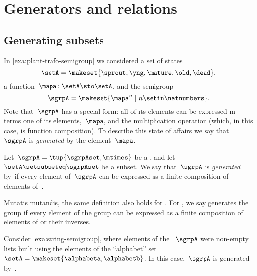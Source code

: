 
\section{Generators and relations}


\subsection{Generating subsets}

In \cref{exa:plant-trafo-semigroup} we considered a set of states
%
\begin{equation}
    \setA= \makeset{ \sprout, \yng, \mature, \old, \dead },
\end{equation}
%
a function~$\mapa \colon \setA \sto \setA$, and the semigroup
%
\begin{equation}
    \label{eq:trafo-sgrp-one-gen}
    \sgrpA = \makeset{ \mapa^n \mid n \setin \natnumbers }.
\end{equation}
%
Note that~$\sgrpA$ has a special form: all of its elements can be expressed in terms one of its elements,~$\mapa$, and the multiplication operation (which, in this case, is function composition).
To describe this state of affairs we say that~$\sgrpA$ is \emph{generated} by the element~$\mapa$.

\begin{ctdefinition}
    \label{def:gen-semigrp}
    Let~$\sgrpA = \tup{\sgrpAset, \mtimes}$ be a , and let~$\setA \setsubseteq \sgrpAset$ be a subset.
    We say that~$\sgrpA$ is \emph{generated} by~\setA if every element of~$\sgrpA$ can be expressed as a finite composition of elements of~\setA.
\end{ctdefinition}

\begin{remark}
    Mutatis mutandis, the same definition also holds for .
    For , we say \setA generates the group if every element of the group can be expressed as a finite composition of elements of \setA or their inverses.
\end{remark}

\begin{example}
    Consider \cref{exa:string-semigroup}, where elements of the ~$\sgrpA$ were non-empty lists built using the elements of the ``alphabet'' set~$\setA = \makeset{ \alphabeta, \alphabetb}$.
    In this case,~$\sgrpA$ is generated by~\setA.
\end{example}

